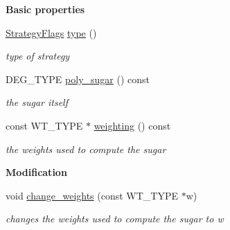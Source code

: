\begin{Indent}\textbf{ Basic properties}\par
\begin{DoxyCompactItemize}
\item 
\mbox{\label{group__strategygroup_a472c39541209b6738cb497ebc3c9e205}} 
\hyperlink{group__strategygroup_ga0ee6c8e033547330e6b89929730007f4}{Strategy\+Flags} \hyperlink{group__strategygroup_a472c39541209b6738cb497ebc3c9e205}{type} ()
\begin{DoxyCompactList}\small\item\em type of strategy \end{DoxyCompactList}\item 
\mbox{\label{group__strategygroup_a2d369a1ab46cf990413f190f22203a3d}} 
D\+E\+G\+\_\+\+T\+Y\+PE \hyperlink{group__strategygroup_a2d369a1ab46cf990413f190f22203a3d}{poly\+\_\+sugar} () const
\begin{DoxyCompactList}\small\item\em the sugar itself \end{DoxyCompactList}\item 
\mbox{\label{group__strategygroup_a0ac423ed3a00a9b7e71dc8103116c82c}} 
const W\+T\+\_\+\+T\+Y\+PE $\ast$ \hyperlink{group__strategygroup_a0ac423ed3a00a9b7e71dc8103116c82c}{weighting} () const
\begin{DoxyCompactList}\small\item\em the weights used to compute the sugar \end{DoxyCompactList}\end{DoxyCompactItemize}
\end{Indent}
\begin{Indent}\textbf{ Modification}\par
\begin{DoxyCompactItemize}
\item 
\mbox{\label{group__strategygroup_aa8fbd9cf3d9e391a9db0ececdabea03f}} 
void \hyperlink{group__strategygroup_aa8fbd9cf3d9e391a9db0ececdabea03f}{change\+\_\+weights} (const W\+T\+\_\+\+T\+Y\+PE $\ast$w)
\begin{DoxyCompactList}\small\item\em changes the weights used to compute the sugar to {\ttfamily w} \end{DoxyCompactList}\end{DoxyCompactItemize}
\end{Indent}
